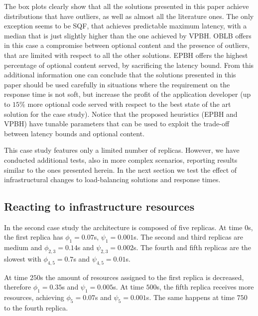 The box plots clearly show that all the solutions presented in this
paper achieve distributions that have outliers, as well as almost all
the literature ones. The only exception seems to be SQF, that achieves
predictable maximum latency, with a median that is just slightly
higher than the one achieved by VPBH. OBLB offers in this case a
compromise between optional content and the presence of outliers, that
are limited with respect to all the other solutions. EPBH offers the
highest percentage of optional content served, by sacrificing the
latency bound. From this additional information one can conclude that
the solutions presented in this paper should be used carefully in
situations where the requirement on the response time is not soft, but
increase the profit of the application developer (up to $15\%$ more
optional code served with respect to the best state of the art
solution for the case study). Notice that the proposed heuristics
(EPBH and VPBH) have tunable parameters that can be used to exploit
the trade-off between latency bounds and optional content.

This case study features only a limited number of replicas. However,
we have conducted additional tests, also in more complex scenarios,
reporting results similar to the ones presented herein. In the next
section we test the effect of infrastructural changes to
load-balancing solutions and response times.

\subsection{Reacting to infrastructure resources}

In the second case study the architecture is composed of five
replicas. At time $0$s, the first replica has $\phi_1 = 0.07$s,
$\psi_1 = 0.001$s. The second and third replicas are medium and
$\phi_{2,3} = 0.14$s and $\psi_{2,3} = 0.002$s. The fourth and fifth
replicas are the slowest with $\phi_{4,5} = 0.7$s and $\psi_{4,5} =
0.01$s.

At time $250$s the amount of resources assigned to the first replica
is decreased, therefore $\phi_1 = 0.35$s and $\psi_1 = 0.005$s. At
time $500$s, the fifth replica receives more resources, achieving
$\phi_5 = 0.07$s and $\psi_5 = 0.001$s. The same happens at time $750$
to the fourth replica.

